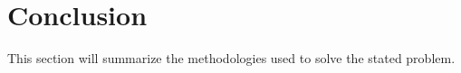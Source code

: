 \section {Conclusion}

This section will summarize the methodologies used to solve the stated problem.
